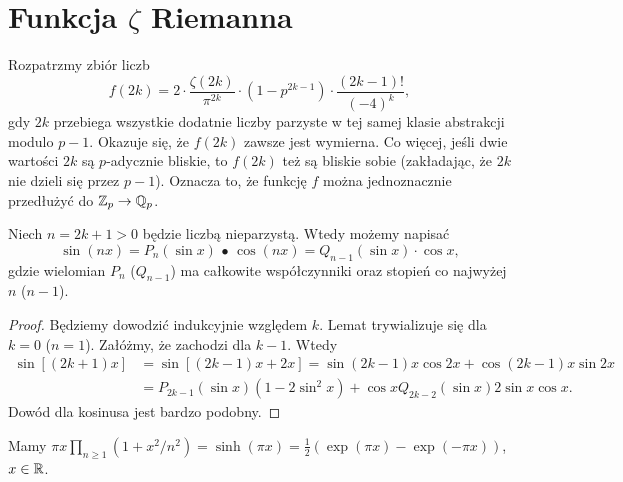 \section{Funkcja $\zeta$ Riemanna}
Rozpatrzmy  zbiór liczb
\[
	f(2k) = 2 \cdot \frac{\zeta(2k)}{\pi^{2k}} \cdot (1-p^{2k-1}) \cdot \frac{(2k-1)!}{(-4)^k},
\]
gdy $2k$ przebiega wszystkie dodatnie liczby parzyste w tej samej klasie abstrakcji modulo $p-1$.
Okazuje się, że $f(2k)$  zawsze jest wymierna.
Co więcej, jeśli dwie wartości $2k$ są $p$-adycznie bliskie, to $f(2k)$ też są bliskie sobie (zakładając, że $2k$ nie dzieli się przez $p-1$).
Oznacza to, że funkcję $f$ można jednoznacznie przedłużyć do $\mathbb Z_p \to \mathbb Q_p$.

\begin{lemat}
	Niech $n = 2k+1 > 0$ będzie liczbą nieparzystą.
	Wtedy możemy napisać
	\[
		\sin (nx) = P_n(\sin x) \,\bullet\,
		\cos (nx) = Q_{n-1} (\sin x) \cdot \cos x,
	\]
	gdzie wielomian $P_n$ ($Q_{n-1}$) ma całkowite współczynniki oraz stopień co najwyżej $n$ ($n-1$).
\end{lemat}

\begin{proof}
	Będziemy dowodzić indukcyjnie względem $k$.
	Lemat trywializuje się dla $k = 0$ ($n = 1$).
	Załóżmy, że zachodzi dla $k - 1$.
	Wtedy
	\begin{align*}
	\sin [(2k+1)x]  & = \sin [(2k-1)x + 2x]  = \sin(2k-1)x \cos 2x + \cos(2k-1)x \sin 2x \\
	& = P_{2k-1}(\sin x) (1-2\sin^2 x) + \cos x Q_{2k-2} (\sin x) 2 \sin x \cos x.
	\end{align*}
	Dowód dla kosinusa jest bardzo podobny.
\end{proof}

\begin{fakt}\label{sine}
	Mamy $\pi x \prod_{n \ge 1} (1 + x^2/n^2) = \sinh (\pi x) = \frac 12 (\exp (\pi x) - \exp(-\pi x))$, $x \in \mathbb R$.
\end{fakt}

